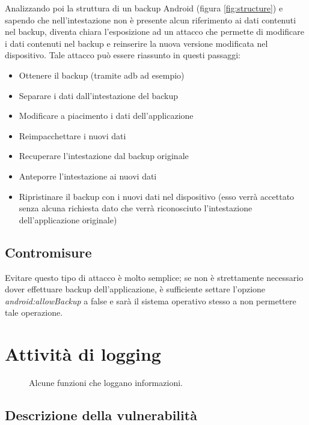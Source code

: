 Analizzando poi la struttura di un backup Android (figura \ref{fig:structure}) e sapendo che nell'intestazione non è presente alcun riferimento ai dati contenuti nel backup, diventa chiara l'esposizione ad un attacco che permette di modificare i dati contenuti nel backup e reinserire la nuova versione modificata nel dispositivo. Tale attacco può essere riassunto in questi passaggi:

\begin{itemize}
	\item Ottenere il backup (tramite adb ad esempio)
	\item Separare i dati dall'intestazione del backup
	\item Modificare a piacimento i dati dell'applicazione
	\item Reimpacchettare i nuovi dati
	\item Recuperare l'intestazione dal backup originale
	\item Anteporre l'intestazione ai nuovi dati
	\item Ripristinare il backup  con i nuovi dati nel dispositivo (esso verrà accettato senza alcuna richiesta dato che verrà riconosciuto l'intestazione dell'applicazione originale)
\end{itemize}

\subsection{Contromisure}

Evitare questo tipo di attacco è molto semplice; se non è strettamente necessario dover effettuare backup dell'applicazione, è sufficiente settare l'opzione \emph{android:allowBackup} a false e sarà il sistema operativo stesso a non permettere tale operazione.

\section{Attività di logging}

\begin{figure}[h]
	\centering 
	\caption{Alcune funzioni che loggano informazioni.}
	\label{fig:log}
\end{figure}

\subsection{Descrizione della vulnerabilità}


